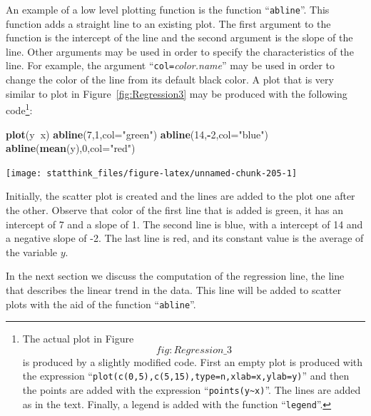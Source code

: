 \documentclass[]{krantz}
\makeatletter
\newenvironment{Shaded}{\begin{snugshade}}{\end{snugshade}}
\newcommand{\DataTypeTok}[1]{\textcolor[rgb]{0.13,0.29,0.53}{#1}}
\newcommand{\DecValTok}[1]{\textcolor[rgb]{0.00,0.00,0.81}{#1}}
\newcommand{\KeywordTok}[1]{\textcolor[rgb]{0.13,0.29,0.53}{\textbf{#1}}}
\newcommand{\NormalTok}[1]{#1}
\newcommand{\OperatorTok}[1]{\textcolor[rgb]{0.81,0.36,0.00}{\textbf{#1}}}
\newcommand{\StringTok}[1]{\textcolor[rgb]{0.31,0.60,0.02}{#1}}
\newenvironment{kframe}{%
\medskip{}
\setlength{\fboxsep}{.8em}
 \def\at@end@of@kframe{}%
 \ifinner\ifhmode%
  \def\at@end@of@kframe{\end{minipage}}%
  \begin{minipage}{\columnwidth}%
 \fi\fi%
 \def\FrameCommand##1{\hskip\@totalleftmargin \hskip-\fboxsep
 \colorbox{shadecolor}{##1}\hskip-\fboxsep
     \hskip-\linewidth \hskip-\@totalleftmargin \hskip\columnwidth}%
 \MakeFramed {\advance\hsize-\width
   \@totalleftmargin\z@ \linewidth\hsize
   \@setminipage}}%
 {\par\unskip\endMakeFramed%
 \at@end@of@kframe}
\renewenvironment{Shaded}{\begin{kframe}}{\end{kframe}}
\theoremstyle{definition}
\theoremstyle{definition}
\theoremstyle{definition}
\theoremstyle{remark}
\makeatother
\begin{document}
An example of a low level plotting function is the function ``\texttt{abline}''.
This function adds a straight line to an existing plot. The first
argument to the function is the intercept of the line and the second
argument is the slope of the line. Other arguments may be used in order
to specify the characteristics of the line. For example, the argument
``\texttt{col=}\emph{color.name}'' may be used in order to change the color of the
line from its default black color. A plot that is very similar to plot
in Figure~\ref{fig:Regression3} may be produced with the following
code\footnote{The actual plot in Figure~\[fig:Regression\_3\] is produced by a
  slightly modified code. First an empty plot is produced with the
  expression ``\texttt{plot(c(0,5),c(5,15),type=n,xlab=x,ylab=y)}'' and then
  the points are added with the expression ``\texttt{points(y\textasciitilde{}x)}''. The lines
  are added as in the text. Finally, a legend is added with the
  function ``\texttt{legend}''.}:

\begin{Shaded}
\begin{Highlighting}[]
\KeywordTok{plot}\NormalTok{(y}\OperatorTok{~}\NormalTok{x)}
\KeywordTok{abline}\NormalTok{(}\DecValTok{7}\NormalTok{,}\DecValTok{1}\NormalTok{,}\DataTypeTok{col=}\StringTok{"green"}\NormalTok{)}
\KeywordTok{abline}\NormalTok{(}\DecValTok{14}\NormalTok{,}\OperatorTok{-}\DecValTok{2}\NormalTok{,}\DataTypeTok{col=}\StringTok{"blue"}\NormalTok{)}
\KeywordTok{abline}\NormalTok{(}\KeywordTok{mean}\NormalTok{(y),}\DecValTok{0}\NormalTok{,}\DataTypeTok{col=}\StringTok{"red"}\NormalTok{)}
\end{Highlighting}
\end{Shaded}

\begin{center}\texttt{[image: statthink\_files/figure-latex/unnamed-chunk-205-1]} \end{center}

Initially, the scatter plot is created and the lines are added to the
plot one after the other. Observe that color of the first line that is
added is green, it has an intercept of 7 and a slope of 1. The second
line is blue, with a intercept of 14 and a negative slope of -2. The
last line is red, and its constant value is the average of the variable
\(y\).

In the next section we discuss the computation of the regression line,
the line that describes the linear trend in the data. This line will be
added to scatter plots with the aid of the function ``\texttt{abline}''.
\end{document}
